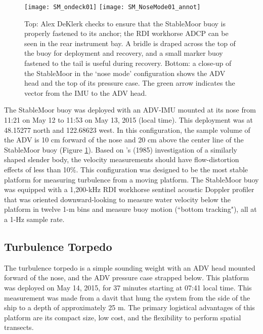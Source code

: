 \begin{figure}[t]
  \centering
  \texttt{[image: SM\_ondeck01]}
  \texttt{[image: SM\_NoseMode01\_annot]}
  \caption{Top: Alex DeKlerk checks to ensure that the StableMoor buoy is properly fastened to its anchor; the RDI workhorse ADCP can be seen in the rear instrument bay. A bridle is draped across the top of the buoy for deployment and recovery, and a small marker buoy fastened to the tail is useful during recovery.  Bottom: a close-up of the StableMoor in the `nose mode' configuration shows the ADV head and the top of its pressure case. The green arrow indicates the vector from the IMU to the ADV head. 
}
  \label{fig:SM}
\end{figure}

The StableMoor buoy was deployed with an ADV-IMU mounted at its nose from 11:21 on May 12 to 11:53 on May 13, 2015 (local time). This deployment was at 48.15277 north and 122.68623 west. In this configuration, the sample volume of the ADV is 10 cm forward of the nose and 20 cm above the center line of the StableMoor buoy (Figure \ref{fig:SM}). Based on \citeauthor{Wyngaard++1985}'s (1985) investigation of a similarly shaped slender body, the velocity measurements should have flow-distortion effects of less than 10\%. This configuration was designed to be the most stable platform for measuring turbulence from a moving platform. The StableMoor buoy was equipped with a 1,200-kHz RDI workhorse sentinel acoustic Doppler profiler that was oriented downward-looking to measure water velocity below the platform in twelve 1-m bins and measure buoy motion (``bottom tracking"), all at a 1-Hz sample rate. 

\subsection{Turbulence Torpedo}

The turbulence torpedo is a simple sounding weight with an ADV head mounted forward of the nose, and the ADV pressure case strapped below. This platform was deployed on May 14, 2015, for 37 minutes starting at 07:41 local time.  This measurement was made from a davit that hung the system from the side of the ship to a depth of approximately 25 m. The primary logistical advantages of this platform are its compact size, low cost, and the flexibility to perform spatial transects.  

